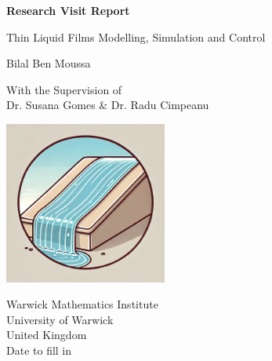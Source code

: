 \documentclass[12pt]{article}
\begin{document}
\begin{titlepage}
    \begin{center}
        \vspace*{1cm}
            
        \Huge
        \textbf{Research Visit Report}
            
        \vspace{0.5cm}
        \LARGE
        Thin Liquid Films Modelling, Simulation and Control
            
        \vspace{1.5cm}
            
        Bilal Ben Moussa
            
        \vfill
            
        With the Supervision of \\
        Dr. Susana Gomes \& Dr. Radu Cimpeanu
            
        \vspace{0.8cm}
            
        \includegraphics[width=0.4\textwidth]{cartoon_thin_film.png}
            
        \Large
        Warwick Mathematics Institute\\
        University of Warwick\\
        United Kingdom\\
        Date to fill in
    \end{center}
\end{titlepage}

\newpage
\end{document}
